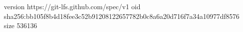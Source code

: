 version https://git-lfs.github.com/spec/v1
oid sha256:bb105f8b4d18fee3c52b91208122657782b0c8a6a20d716f7a34a10977df8576
size 536136
